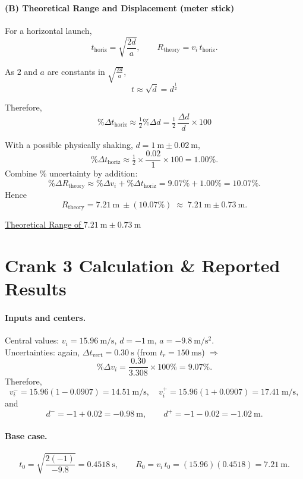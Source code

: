 \documentclass[12pt]{article}
\begin{document}
\paragraph{(B) Theoretical Range and Displacement (meter stick)}
For a horizontal launch,
\[
t_{\mathrm{horiz}}=\sqrt{\frac{2d}{a}},\qquad R_{\mathrm{theory}}=v_i\,t_{\mathrm{horiz}}.
\]

As $2$ and $a$ are constants in $\sqrt{\frac{2d}{a}}$,
\[
t \approx \sqrt{d} = d^{\frac{1}{2}}
\]

Therefore,
\[
\%\Delta t_{\mathrm{horiz}} \approx 
\tfrac12\%\Delta d 
= \tfrac12\,\frac{\Delta d}{d}\times 100
\]
\vspace{1em}


With a possible physically shaking, $d=1~\mathrm{m}\pm0.02~\mathrm{m}$,
\[
\%\Delta t_{\mathrm{horiz}} \approx \tfrac12\times\frac{0.02}{1}\times 100 = 1.00\%.
\]
Combine \% uncertainty by addition:
\[
\%\Delta R_{\mathrm{theory}} \approx \%\Delta v_i + \%\Delta t_{\mathrm{horiz}}
= 9.07\% + 1.00\% = \boxed{10.07\%}.
\]
Hence
\[
R_{\mathrm{theory}} = 7.21~\mathrm{m} \ \pm (10.07\%)
\;\approx\;
7.21~\mathrm{m} \pm 0.73~\mathrm{m}.
\]

\vspace{1em}


\noindent\hfill\underline{
Theoretical Range of 
$7.21~\mathrm{m} \pm 0.73~\mathrm{m}$
}

\newpage
\section{Crank 3 Calculation \& Reported Results}
\paragraph{Inputs and centers.}
Central values: $v_i=15.96~\mathrm{m/s}$, $d=-1~\mathrm{m}$, $a=-9.8~\mathrm{m/s^2}$.\\
Uncertainties: again, $\Delta t_{\text{vert}}=0.30~\mathrm{s}$ (from $t_r=150~\mathrm{ms}$) $\Rightarrow$
\[
\%\Delta v_i=\frac{0.30}{3.308}\times 100\%=9.07\%.
\]
Therefore, 
\[
v_i^{-}=15.96(1-0.0907)=14.51~\mathrm{m/s},\quad
v_i^{+}=15.96(1+0.0907)=17.41~\mathrm{m/s},
\]
and
\[
d^{-}=-1+0.02=-0.98~\mathrm{m},\qquad
d^{+}=-1-0.02=-1.02~\mathrm{m}.
\]

\paragraph{Base case.}
\[
t_0=\sqrt{\frac{2(-1)}{-9.8}}=0.4518~\mathrm{s},\qquad
R_0=v_i\,t_0=(15.96)(0.4518)=\boxed{7.21~\mathrm{m}}.
\]
\end{document}
